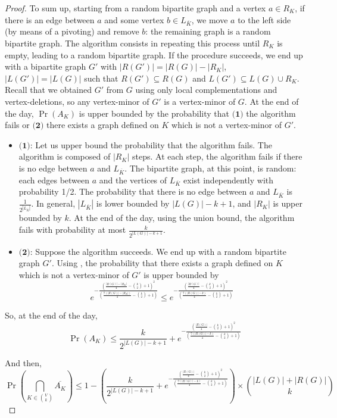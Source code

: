 \documentclass[10pt,a4paper]{article}
\newcommand{\se}{\subseteq}
\newcommand{\ls}{\leqslant}
\begin{document}
\begin{proof}
    To sum up, starting from a random bipartite graph and a vertex $a\in R_K$, if there is an edge between $a$ and some vertex $b\in L_{\overline K}$, we move $a$ to the left side (by means of a pivoting) and remove $b$: the remaining graph is a random bipartite graph. The algorithm consists in repeating this process until $R_K$ is empty, leading to a random bipartite graph. If the procedure succeeds, we end up with a bipartite graph $G'$ with $|R(G')|=|R(G)|-|R_K|$, $|L(G')|=|L(G)|$ such that $R(G') \se R(G)$ and $L(G') \se L(G) \cup R_K$. Recall that we obtained $G'$ from $G$ using only local complementations and vertex-deletions, so any vertex-minor of $G'$ is a vertex-minor of $G$. At the end of the day, $\Pr(A_K)$ is upper bounded by the probability that $\textbf{(1)}$ the algorithm fails or $\textbf{(2)}$ there exists a graph defined on $K$ which is not a vertex-minor of $G'$.
    \begin{itemize}
        \item $\textbf{(1)}$: Let us upper bound the probability that the algorithm fails. The algorithm is composed of $|R_K|$ steps. At each step, the algorithm fails if there is no edge between $a$ and $L_{\overline K}$. The bipartite graph, at this point, is random: each edges between $a$ and the vertices of $L_{\overline K}$ exist independently with probability 1/2. The probability that there is no edge between $a$ and $L_{\overline K}$ is $\frac{1}{2^{|L_{\overline K}|}}$.  In general, $|L_{\overline K}|$ is lower bounded by $|L(G)|-k+1$, and $|R_K|$ is upper bounded by $k$. At the end of the day, using the union bound, the algorithm fails with probability at most $\frac{k}{2^{|L(G)|-k+1}}$. 
        \item $\textbf{(2)}$: Suppose the algorithm succeeds. We end up with a random bipartite graph $G'$. Using , the probability that there exists a graph defined on $K$ which is not a vertex-minor of $G'$ is upper bounded by $$e^{-\frac{\left(\frac{|R(G)|-|R_K|}{4}-{k \choose 2}+1\right)^2}{\left(\frac{7(|R(G)|-|R_K|)}{4}-{k \choose 2}+1\right)}} \ls e^{-\frac{\left(\frac{|R(G)|}{4}-{k \choose 2}+1\right)^2}{\left(\frac{7(|R(G)|-k)}{4}-{k \choose 2}+1\right)}}$$
    \end{itemize}

    So, at the end of the day, $$ \Pr(A_K) \ls \frac{k}{2^{|L(G)|-k+1}} + e^{-\frac{\left(\frac{|R(G)|}{4}-{k \choose 2}+1\right)^2}{\left(\frac{7(|R(G)|-k)}{4}-{k \choose 2}+1\right)}}$$

    And then,
    $$\Pr\left( \bigcap_{K \in {V \choose k}} \overline{A_K}\right)  \ls 1 - \left( \frac{k}{2^{|L(G)|-k+1}} + e^{-\frac{\left(\frac{|R(G)|}{4}-{k \choose 2}+1\right)^2}{\left(\frac{7(|R(G)|-k)}{4}-{k \choose 2}+1\right)}}\right)\times {|L(G)|+|R(G)| \choose k}$$

\end{proof}
\end{document}
